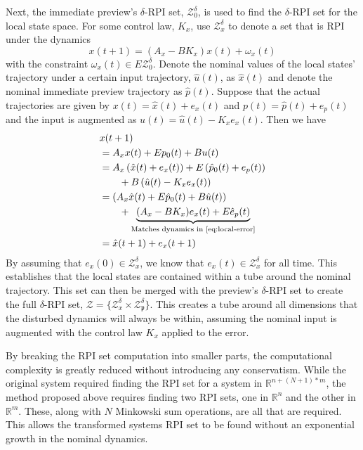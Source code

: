Next, the immediate preview's $\delta$-RPI set, $\mathcal{Z}_0^\delta$, is used to find the $\delta$-RPI set for the local state space. For some control law, $K_x$, use $\mathcal{Z}_x^\delta$ to denote a set that is RPI under the dynamics
\begin{equation}\label{eq:local-error}
    x(t+1) = (A_x - BK_x)x(t) + \omega_x(t)
\end{equation}
with the constraint $\omega_x(t)\in E\mathcal{Z}_0^\delta$. Denote the nominal values of the local states' trajectory under a certain input trajectory, $\hat{u}(t)$, as $\hat{x}(t)$ and denote the nominal immediate preview trajectory as $\hat{p}(t)$. Suppose that the actual trajectories are given by $x(t)=\hat{x}(t)+e_x(t)$ and $p(t)=\hat{p}(t)+e_p(t)$ and the input is augmented as $u(t)=\hat{u}(t)-K_xe_x(t)$. Then we have
\begin{align*}
    &x(t+1)\\
    &=A_xx(t) + Ep_0(t) + Bu(t)\\
    &=A_x\left(\hat{x}(t)+e_x(t)\right) + E\left(\hat{p}_0(t)+e_p(t)\right)\\ 
    &\qquad+ B\left(\hat{u}(t)-K_xe_x(t)\right)\\
    &= \left(A_x\hat{x}(t)+E\hat{p}_0(t)+B\hat{u}(t)\right)\\
    &\qquad + \underbrace{(A_x-BK_x)e_x(t)+E\hat{e}_p(t)}_{\text{Matches dynamics in \eqref{eq:local-error}}}\\
    &=\hat{x}(t+1)+e_x(t+1)
\end{align*}
By assuming that $e_x(0)\in\mathcal{Z}_x^\delta$, we know that $e_x(t)\in\mathcal{Z}_x^\delta$ for all time. This establishes that the local states are contained within a tube around the nominal trajectory. This set can then be merged with the preview's $\delta$-RPI set to create the full $\delta$-RPI set, $\mathcal{Z}=\{\mathcal{Z}_x^\delta\times \mathcal{Z}_{\mathfrak{p}}^\delta\}$. This creates a tube around all dimensions that the disturbed dynamics will always be within, assuming the nominal input is augmented with the control law $K_x$ applied to the error.

By breaking the RPI set computation into smaller parts, the computational complexity is greatly reduced without introducing any conservatism. While the original system required finding the RPI set for a system in $\mathbb{R}^{n+(N+1)*m}$, the method proposed above requires finding two RPI sets, one in $\mathbb{R}^n$ and the other in $\mathbb{R}^m$. These, along with $N$ Minkowski sum operations, are all that are required. This allows the transformed systems RPI set to be found without an exponential growth in the nominal dynamics.

